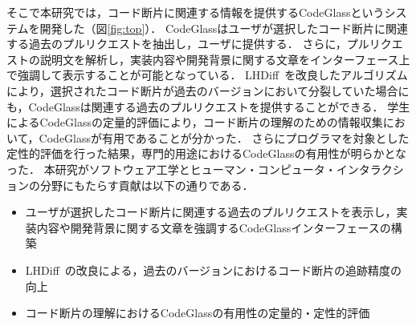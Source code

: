 そこで本研究では，コード断片に関連する情報を提供するCodeGlassというシステムを開発した（図\ref{fig:top}）．
CodeGlassはユーザが選択したコード断片に関連する過去のプルリクエストを抽出し，ユーザに提供する．
さらに，プルリクエストの説明文を解析し，実装内容や開発背景に関する文章をインターフェース上で強調して表示することが可能となっている．
LHDiff~\cite{LHDiff}を改良したアルゴリズムにより，選択されたコード断片が過去のバージョンにおいて分裂していた場合にも，CodeGlassは関連する過去のプルリクエストを提供することができる．
学生によるCodeGlassの定量的評価により，コード断片の理解のための情報収集において，CodeGlassが有用であることが分かった．
さらにプログラマを対象とした定性的評価を行った結果，専門的用途におけるCodeGlassの有用性が明らかとなった．
本研究がソフトウェア工学とヒューマン・コンピュータ・インタラクションの分野にもたらす貢献は以下の通りである．




\begin{itemize}
\item ユーザが選択したコード断片に関連する過去のプルリクエストを表示し，実装内容や開発背景に関する文章を強調するCodeGlassインターフェースの構築
\item LHDiff~\cite{LHDiff}の改良による，過去のバージョンにおけるコード断片の追跡精度の向上
\item コード断片の理解におけるCodeGlassの有用性の定量的・定性的評価
\end{itemize}


